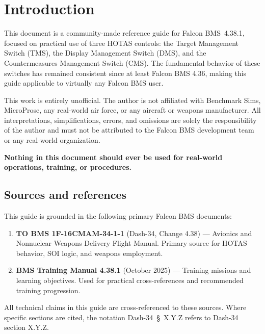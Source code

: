 \documentclass[11pt, a4paper, twoside]{report}
\newcommand{\dashref}[1]{Dash-34~\S~#1}
\newcommand{\bmsver}{Falcon BMS~4.38.1}
\begin{document}
\chapter{Introduction}
\label{chap:C1}

This document is a community-made reference guide for \bmsver, focused on practical use of three HOTAS controls: the Target Management Switch (TMS), the Display Management Switch (DMS), and the Countermeasures Management Switch (CMS). The fundamental behavior of these switches has remained consistent since at least Falcon BMS 4.36, making this guide applicable to virtually any Falcon BMS user.

This work is entirely unofficial. The author is not affiliated with Benchmark Sims, MicroProse, any real-world air force, or any aircraft or weapons manufacturer. All interpretations, simplifications, errors, and omissions are solely the responsibility of the author and must not be attributed to the Falcon BMS development team or any real-world organization.

\textbf{Nothing in this document should ever be used for real-world operations, training, or procedures.}

\section{Sources and references}
\label{sec:C1-S1}

This guide is grounded in the following primary Falcon BMS documents:

\begin{enumerate}
	\item \textbf{TO BMS 1F-16CMAM-34-1-1} (Dash-34, Change 4.38) --- Avionics and Nonnuclear Weapons Delivery Flight Manual. Primary source for HOTAS behavior, SOI logic, and weapons employment.
	\item \textbf{BMS Training Manual 4.38.1} (October 2025) --- Training missions and learning objectives. Used for practical cross-references and recommended training progression.
\end{enumerate}

All technical claims in this guide are cross-referenced to these sources. Where specific sections are cited, the notation \dashref{X.Y.Z} refers to Dash-34 section X.Y.Z.
\end{document}
